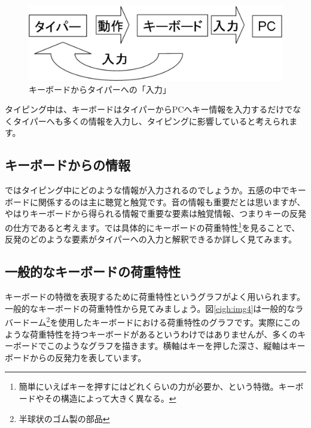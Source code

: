 \begin{figure}
 \begin{center}
   \includegraphics[width=14cm,clip]{res_eigh/img2.eps}
 \end{center}
 \caption{キーボードからタイパーへの「入力」}
 \label{eigh:img2}
\end{figure}

タイピング中は、キーボードはタイパーからPCへキー情報を入力するだけでなくタイパーへも多くの情報を入力し、タイピングに影響していると考えられます。

\subsection{キーボードからの情報}

ではタイピング中にどのような情報が入力されるのでしょうか。五感の中でキーボードに関係するのは主に聴覚と触覚です。音の情報も重要だとは思いますが、やはりキーボードから得られる情報で重要な要素は触覚情報、つまりキーの反発の仕方であると考えます。では具体的にキーボードの荷重特性\footnote{簡単にいえばキーを押すにはどれくらいの力が必要か、という特徴。キーボードやその構造によって大きく異なる。}を見ることで、反発のどのような要素がタイパーへの入力と解釈できるか詳しく見てみます。

\subsection{一般的なキーボードの荷重特性}

キーボードの特徴を表現するために荷重特性というグラフがよく用いられます。一般的なキーボードの荷重特性から見てみましょう。図\ref{eigh:img4}は一般的なラバードーム\footnote{半球状のゴム製の部品}を使用したキーボードにおける荷重特性のグラフです。実際にこのような荷重特性を持つキーボードがあるというわけではありませんが、多くのキーボードでこのようなグラフを描きます。横軸はキーを押した深さ、縦軸はキーボードからの反発力を表しています。

